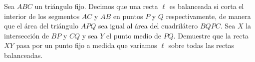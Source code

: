 \begin{problem}
    Sea $ABC$ un tri\'angulo fijo. Decimos que una recta $\ell$ es balanceada si corta el interior de los segmentos $AC$ y $AB$ en puntos $P$ y $Q$ respectivamente, de manera que el \'area
    del tri\'angulo $APQ$ sea igual al \'area del cuadril\'atero $BQPC$. Sea $X$ la intersecci\'on de $BP$ y $CQ$ y sea $Y$ el punto medio de $PQ$.
    Demuestre que la recta $XY$ pasa por un punto fijo a medida que variamos $\ell$ sobre todas las rectas balanceadas.
    \label{24MEXIBEROTSTB2}
\end{problem}